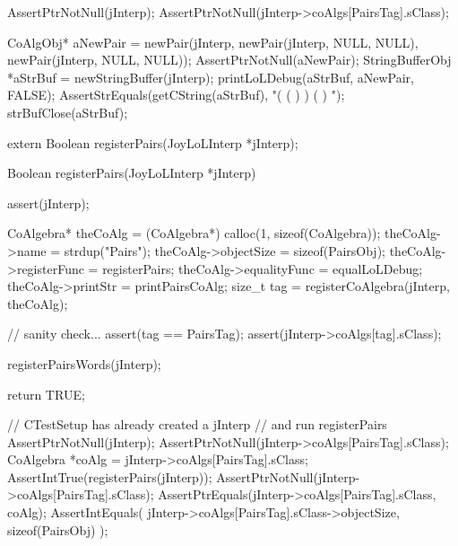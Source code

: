 
\startCTest
  AssertPtrNotNull(jInterp);
  AssertPtrNotNull(jInterp->coAlgs[PairsTag].sClass);

  CoAlgObj* aNewPair = newPair(jInterp,
                               newPair(jInterp, NULL, NULL),
                               newPair(jInterp, NULL, NULL));
  AssertPtrNotNull(aNewPair);
  StringBufferObj *aStrBuf = newStringBuffer(jInterp);
  printLoLDebug(aStrBuf, aNewPair, FALSE);
  AssertStrEquals(getCString(aStrBuf), "( ( ) ) ( ) ");
  strBufClose(aStrBuf);
\stopCTest
\stopTestCase
\stopTestSuite

\startTestSuite[registerPairs]

\startCHeader
extern Boolean registerPairs(JoyLoLInterp *jInterp);
\stopCHeader
{}

\startCCode
Boolean registerPairs(JoyLoLInterp *jInterp) {
  assert(jInterp);
  
  CoAlgebra* theCoAlg    = (CoAlgebra*) calloc(1, sizeof(CoAlgebra));
  theCoAlg->name         = strdup("Pairs");
  theCoAlg->objectSize   = sizeof(PairsObj);
  theCoAlg->registerFunc = registerPairs;
  theCoAlg->equalityFunc = equalLoLDebug;
  theCoAlg->printStr     = printPairsCoAlg;
  size_t tag = registerCoAlgebra(jInterp, theCoAlg);
  
  // sanity check...
  assert(tag == PairsTag);
  assert(jInterp->coAlgs[tag].sClass);
    
  registerPairsWords(jInterp);
  
  return TRUE;
}
\stopCCode


\startCTest
  // CTestSetup has already created a jInterp
  // and run registerPairs
  AssertPtrNotNull(jInterp);
  AssertPtrNotNull(jInterp->coAlgs[PairsTag].sClass);
  CoAlgebra *coAlg = jInterp->coAlgs[PairsTag].sClass;
  AssertIntTrue(registerPairs(jInterp));
  AssertPtrNotNull(jInterp->coAlgs[PairsTag].sClass);
  AssertPtrEquals(jInterp->coAlgs[PairsTag].sClass, coAlg);
  AssertIntEquals(
    jInterp->coAlgs[PairsTag].sClass->objectSize,
    sizeof(PairsObj)
  );
\stopCTest
\stopTestCase
\stopTestSuite

